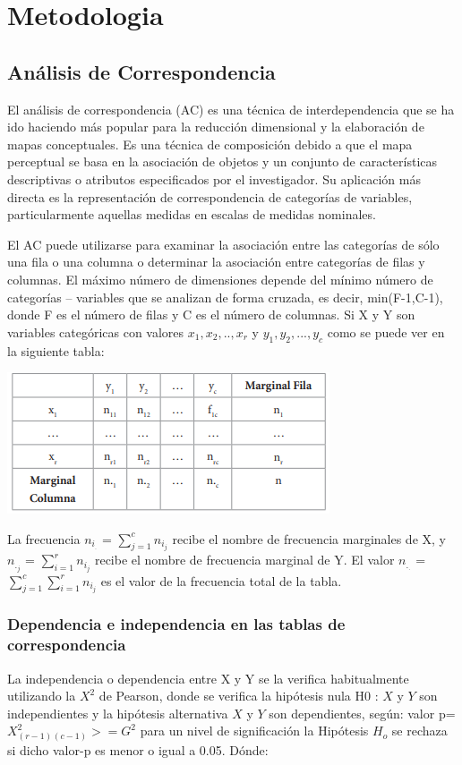 \documentclass[11pt,letter]{article}
\begin{document}
\section{Metodologia}
\subsection{Análisis de Correspondencia}
El análisis de correspondencia
(AC) es una técnica de interdependencia que se ha ido haciendo más
popular para la reducción dimensional y la elaboración de mapas conceptuales. Es una técnica de composición debido a que el mapa perceptual se basa en la asociación de objetos y
un conjunto de características descriptivas o atributos especificados por
el investigador. Su aplicación más
directa es la representación de correspondencia de categorías de variables,
particularmente aquellas medidas en
escalas de medidas nominales.\autocite{guale2012modelo}

El AC puede utilizarse para examinar la asociación entre las categorías de sólo una fila o una columna
o determinar la asociación entre categorías de filas y columnas. El máximo número de dimensiones depende
del mínimo número de categorías
– variables que se analizan de forma
cruzada, es decir, min(F-1,C-1), donde F es el número de filas y C es el
número de columnas. Si X y Y son
variables categóricas con valores {$x_1,x_2,..,x_r$} y ${y_1,y_2,...,y_c}$ como se puede ver en la siguiente tabla:

\includegraphics{tabla_corres.png}

La frecuencia $n_i_.$ = $\sum_{j=1}^{c}n_i_j$ 
recibe  el  nombre  de  frecuencia marginales de X, y     $n_._j$ = $\sum_{i=1}^{r}n_i_j$ recibe
el nombre de frecuencia marginal de
Y. El valor $n_._.$ = $\sum_{j=1}^{c}\sum_{i=1}^{r}n_i_j$ es el valor
de la frecuencia total de la tabla.
\subsubsection{Dependencia e independencia
en las tablas de correspondencia} 
La independencia o dependencia
entre X y Y se la verifica habitualmente utilizando la $X^2$
 de Pearson, donde
se verifica la hipótesis nula H0
: $X$ y $Y$
son independientes y la hipótesis alternativa $X$ y $Y$ son dependientes, según: valor p=$X^2_(r-1)_(c-1) >= G^2$ para
un nivel de significación la Hipótesis
$H_o$ se rechaza si dicho valor-p es
menor o igual a 0.05. Dónde:
\end{document}
